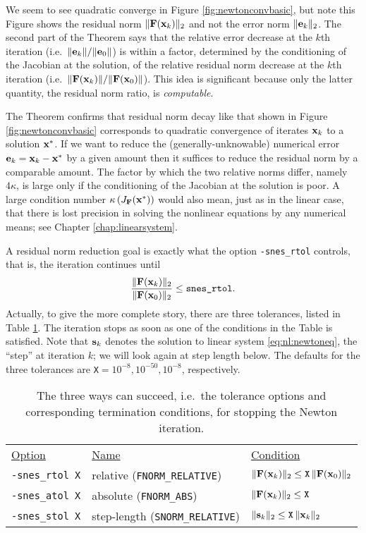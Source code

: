 We seem to see quadratic converge in Figure \ref{fig:newtonconvbasic}, but note this Figure shows the residual norm $\|\mathbf{F}(\mathbf{x}_k)\|_2$ and not the error norm $\|\mathbf{e}_k\|_2$.  The second part of the Theorem says that the relative error decrease at the $k$th iteration (i.e.~$\|\mathbf{e}_k\|/\|\mathbf{e}_0\|$) is within a factor, determined by the conditioning of the Jacobian at the solution, of the relative residual norm decrease at the $k$th iteration (i.e.~$\|\mathbf{F}(\mathbf{x}_k)\|/\|\mathbf{F}(\mathbf{x}_0)\|$).  This idea is significant because only the latter quantity, the residual norm ratio, is \emph{computable}.

The Theorem confirms that residual norm decay like that shown in Figure \ref{fig:newtonconvbasic} corresponds to quadratic convergence of iterates $\mathbf{x}_k$ to a solution $\mathbf{x}^*$.  If we want to reduce the (generally-unknowable) numerical error $\mathbf{e}_k=\mathbf{x}_k-\mathbf{x}^*$ by a given amount then it suffices to reduce the residual norm by a comparable amount.  The factor by which the two relative norms differ, namely $4 \kappa$, is large only if the conditioning of the Jacobian at the solution is poor.  A large condition number $\kappa\left(J_{\mathbf{F}}(\mathbf{x}^*)\right)$ would also mean, just as in the linear case, that there is lost precision in solving the nonlinear equations by any numerical means; see Chapter \ref{chap:linearsystem}.

A residual norm reduction goal is exactly what the option \texttt{-snes\_rtol} controls, that is, the iteration continues until
    $$\frac{\|\mathbf{F}(\mathbf{x}_k)\|_2}{\|\mathbf{F}(\mathbf{x}_0)\|_2} \le \text{\texttt{snes\_rtol}}.$$
Actually, to give the more complete story, there are three \pSNES tolerances, listed in Table \ref{tab:snestolerances}.  The iteration stops as soon as one of the conditions in the Table is satisfied.  Note that $\mathbf{s}_k$ denotes the solution to linear system \eqref{eq:nl:newtoneq}, the ``step'' at iteration $k$; we will look again at step length below.  The defaults for the three tolerances are \texttt{X}$=10^{-8},10^{-50},10^{-8}$, respectively.

\begin{table}
\begin{tabular}{lll}
\underline{Option}\hspace{0.2in} & \underline{Name}\hspace{0.2in} & \underline{Condition}\hspace{0.2in} \\
\texttt{-snes\_rtol X} & relative (\texttt{FNORM\_RELATIVE}) & $\|\mathbf{F}(\mathbf{x}_k)\|_2 \le \text{\texttt{X}}\, \|\mathbf{F}(\mathbf{x}_0)\|_2$ \\
\texttt{-snes\_atol X} & absolute (\texttt{FNORM\_ABS}) & $\|\mathbf{F}(\mathbf{x}_k)\|_2 \le \text{\texttt{X}}$ \\
\texttt{-snes\_stol X} & step-length (\texttt{SNORM\_RELATIVE}) & $\|\mathbf{s}_k\|_2 \le \text{\texttt{X}}\, \|\mathbf{x}_k\|_2$
\end{tabular}
\caption{The three ways \pSNES can succeed, i.e.~the tolerance options and corresponding termination conditions, for stopping the Newton iteration.} \label{tab:snestolerances}
\end{table}

